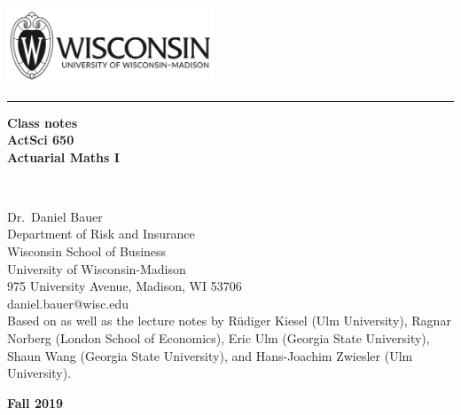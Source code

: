 \documentclass[11pt,fleqn,oneside]{book}
\begin{document}
\begin{titlepage}
\newlength{\widthOne} \newlength{\widthTwo}
\centering\Large\sffamily
{}
\vspace*{\fill}

\includegraphics[height=2.3cm]{Graphs/wisc.png}
\quad\rule[-12pt]{1mm}{90pt}\quad
\parbox[b]{\widthTwo}{\fontsize{17}{20}\selectfont\bfseries 
 Class notes \\ActSci 650\\ Actuarial Maths I}\\

\vfill			

Dr.\ Daniel Bauer 		\\%
Department of Risk and Insurance				\\
Wisconsin School of Business					\\ 
University of Wisconsin-Madison				\\
975 University Avenue, Madison, WI 53706				\\
daniel.bauer@wisc.edu\\

\vspace{2.5cm}
{\footnotesize
Based on \cite{BOWERS} as well as the lecture notes by R\"{u}diger Kiesel (Ulm University), Ragnar Norberg (London School of Economics), Eric Ulm (Georgia State University), Shaun Wang (Georgia State University), and Hans-Joachim Zwiesler (Ulm University).
}

\vfill
{\large \textbf{Fall 2019}}
\end{titlepage}


\setcounter{secnumdepth}{3} %
\renewcommand{\thesubsubsection}{\alph{subsubsection})} %
\setcounter{tocdepth}{2}    %
\tableofcontents %
\cleardoublepage %
\end{document}
